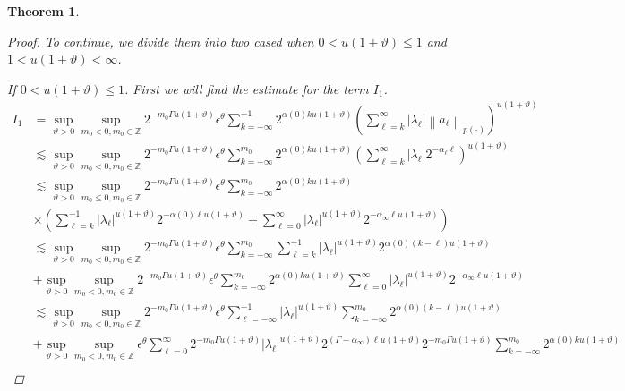 \documentclass[oneside,reqno]{amsart}
\newtheorem{theorem}{Theorem}[section]
\numberwithin{equation}{section}
\theoremstyle{definition}
\begin{document}
\begin{theorem}
\begin{proof}
To continue, we divide them into two cased when $0<u(1+\vartheta) \leq  1$ and $1<u(1+\vartheta)<\infty$.

If $0<u(1+\vartheta) \leq  1$.
First we will find the estimate for the term $I_1$. 
\begin{align*}
I_{1}&=  \sup_{\vartheta>0 }\sup _{m_0<0  , m_0\in  \mathbb{Z}} 2^{-m_0\Gamma u(1+\vartheta)} \epsilon  ^\theta\sum_{k=-\infty}^{-1} 2^{  \alpha(0) k u(1+\vartheta)}\left(\sum_{\ell=k}^{\infty}\left|\lambda_\ell \right|\left\|a_\ell \right\|_{{p(\cdot)}}\right)^{u(1+\vartheta)}\\
& \lesssim \sup_{\vartheta>0 }\sup _{m_0<0  , m_0\in  \mathbb{Z}} 2^{-m_0\Gamma u(1+\vartheta)} \epsilon  ^\theta \sum_{k=-\infty}^{m_0} 2^{\alpha(0)k u(1+\vartheta)}\left(\sum_{\ell=k}^{\infty}\left|\lambda_\ell \right| 2^{-\alpha_\ell  \ell }\right)^{u(1+\vartheta)} \\
&\lesssim  \sup_{\vartheta>0 }\sup _{m_0\leq 0, m_0\in  \mathbb{Z}} 2^{-m_0\Gamma u(1+\vartheta)} \epsilon  ^\theta \sum_{k=-\infty}^{m_0} 2^{\alpha(0)k u(1+\vartheta)}  \\
& \times\left(\sum_{\ell=k}^{-1}\left|\lambda_\ell \right|^{u(1+\vartheta)} 2^{-\alpha(0) \ell u(1+\vartheta)}+\sum_{\ell=0}^{\infty}\left|\lambda_\ell \right|^{u(1+\vartheta)} 2^{-\alpha_{\infty} \ell u(1+\vartheta)}\right)\\
& \lesssim \sup_{\vartheta>0 }\sup _{m_0<0  , m_0\in  \mathbb{Z}} 2^{-m_0\Gamma u(1+\vartheta)} \epsilon  ^\theta \sum_{k=-\infty}^{m_0} \sum_{\ell=k}^{-1}\left|\lambda_\ell \right|^{u(1+\vartheta)} 2^{\alpha(0)(k-\ell) u(1+\vartheta)} \\
& + \sup_{\vartheta>0 }\sup _{m_0<0  , m_0\in  \mathbb{Z}} 2^{-m_0\Gamma u(1+\vartheta)} \epsilon  ^\theta \sum_{k=-\infty}^{m_0} 2^{\alpha(0) k  u(1+\vartheta)} \sum_{\ell=0}^{\infty}\left|\lambda_\ell \right|^{u(1+\vartheta)} 2^{-\alpha_{\infty} \ell u(1+\vartheta)} \\
&\lesssim \sup_{\vartheta>0 }\sup _{m_0<0  , m_0\in  \mathbb{Z}} 2^{-m_0\Gamma u(1+\vartheta)} \epsilon  ^\theta \sum_{\ell=-\infty }^{-1}\left|\lambda_\ell \right|^{u(1+\vartheta)} \sum_{k=-\infty}^{m_0} 2^{\alpha(0)(k-\ell) u(1+\vartheta)} \\
& +\sup_{\vartheta>0 }\sup _{m_0<0  , m_0\in  \mathbb{Z}}  \epsilon  ^\theta \sum_{\ell=0}^{\infty} 2^{-m_0\Gamma u(1+\vartheta)}\left|\lambda_\ell \right|^{u(1+\vartheta)} 2^{\left(\Gamma-\alpha_{\infty}\right) \ell u(1+\vartheta)} 2^{-m_0\Gamma u(1+\vartheta)} \sum_{k=-\infty}^{m_0} 2^{\alpha(0) k u(1+\vartheta)} \\

\end{align*}
\end{proof}
\end{theorem}
\end{document}
